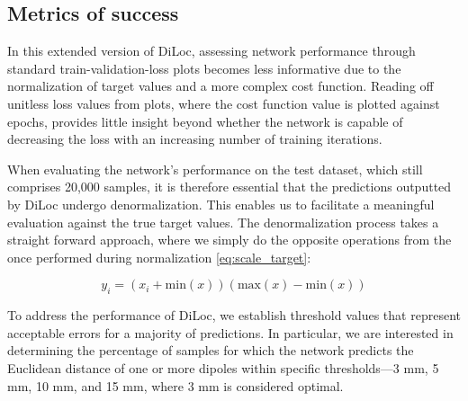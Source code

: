 \documentclass[a4paper, UKenglish, 11pt]{uiomaster}
\begin{document}
\subsection{Metrics of success}
In this extended version of DiLoc, assessing network performance through standard train-validation-loss plots becomes less informative due to the normalization of target values and a more complex cost function. Reading off unitless loss values from plots, where the cost function value is plotted against epochs, provides little insight beyond whether the network is capable of decreasing the loss with an increasing number of training iterations.

When evaluating the network's performance on the test dataset, which still comprises 20,000 samples, it is therefore essential that the predictions outputted by DiLoc undergo denormalization. This enables us to facilitate a meaningful evaluation against the true target values. The denormalization process takes a straight forward approach, where we simply do the opposite operations from the once performed during normalization \ref{eq:scale_target}:

\begin{equation}
y_i = \left(x_i + \text{min}(x)\right) \left(\text{max}(x) - \text{min}(x)\right)
\label{eq:de_scale_target}
\end{equation}
%

To address the performance of DiLoc, we establish threshold values that represent acceptable errors for a majority of predictions. In particular, we are interested in determining the percentage of samples for which the network predicts the Euclidean distance of one or more dipoles within specific thresholds—3 mm, 5 mm, 10 mm, and 15 mm, where 3 mm is considered optimal.
\end{document}
